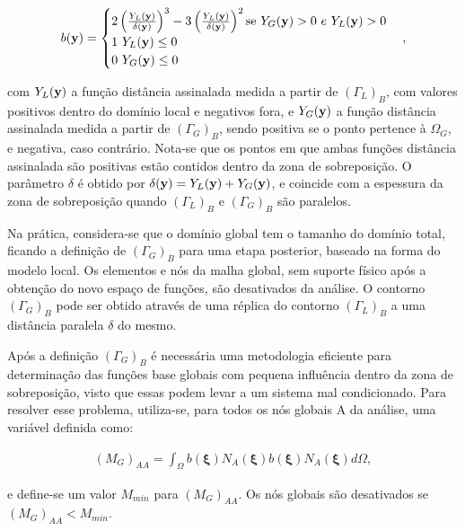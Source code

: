 \begin{align}
b(\mathbf{y}) =  \begin{cases} 2\left(\frac{Y_{L}(\mathbf{y})}{\delta(\mathbf{y})}\right)^3  -   3\left(\frac{Y_{L}(\mathbf{y})}{\delta(\mathbf{y})}\right)^2   \mbox{se } Y_{G}(\mathbf{y})> 0 \ e \ Y_{L}(\mathbf{y})> 0 \\
1  \ Y_{L}(\mathbf{y}) \leq 0  \\
0  \ Y_{G}(\mathbf{y}) \leq 0 \end{cases},
\end{align}

\noindent com $Y_{L}(\mathbf{y})$ a função distância assinalada medida a partir de $(\Gamma_{L})_{B}$, com valores positivos dentro do domínio local e negativos fora, e $Y_{G}(\mathbf{y})$ a função distância assinalada medida a partir de $(\Gamma_{G})_{B}$, sendo positiva se o ponto pertence à $\Omega_{G}$, e negativa, caso contrário. Nota-se que os pontos em que ambas funções distância assinalada são positivas estão contidos dentro da zona de sobreposição. O parâmetro $\delta$ é obtido por $\delta(\mathbf{y}) = Y_{L}(\mathbf{y}) + Y_{G}(\mathbf{y})$, e coincide com a espessura da zona de sobreposição quando $(\Gamma_{L})_{B}$ e $(\Gamma_{G})_{B}$ são paralelos.

Na prática, considera-se que o domínio global tem o tamanho do domínio total, ficando a definição de $(\Gamma_{G})_{B}$ para uma etapa posterior, baseado na forma do modelo local. Os elementos e nós da malha global, sem suporte físico após a obtenção do novo espaço de funções, são desativados da análise. O contorno $(\Gamma_{G})_{B}$ pode ser obtido através de uma réplica do contorno $(\Gamma_{L})_{B}$ a uma distância paralela $\delta$ do mesmo. 

Após a definição $(\Gamma_{G})_{B}$ é necessária uma metodologia eficiente para determinação das funções base globais com pequena influência dentro da zona de sobreposição, visto que essas podem levar a um sistema mal condicionado. Para resolver esse problema, utiliza-se, para todos os nós globais A da análise, uma variável definida como:

\begin{align}
	(M_{G})_{AA} = \int_{\Omega}b(\bm{\xi})N_{A}(\bm{\xi})b(\bm{\xi})N_{A}(\bm{\xi})d\Omega, \label{eq:influence}
\end{align}

\noindent e define-se um valor $M_{min}$ para $(M_{G})_{AA}$. Os nós globais são desativados se $(M_{G})_{AA} < M_{min}$. 

